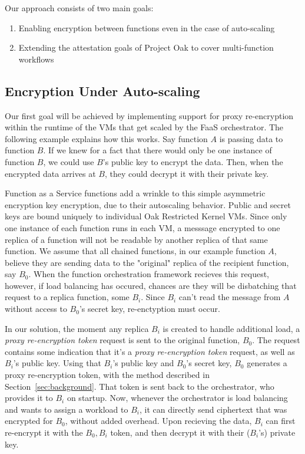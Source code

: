 Our approach consists of two main goals:
\begin{enumerate}
  \item Enabling encryption between functions even in the case of auto-scaling
  \item Extending the attestation goals of Project Oak to cover multi-function workflows
\end{enumerate}

\subsection{Encryption Under Auto-scaling}

Our first goal will be achieved by implementing support for proxy re-encryption within the runtime of the VMs that get scaled by the FaaS orchestrator. The following example explains how this works.
Say function $A$ is passing data to function $B$.
If we knew for a fact that there would only be one instance of function $B$, we could use $B$'s public key to encrypt the data.
Then, when the encrypted data arrives at $B$, they could decrypt it with their private key.

Function as a Service functions add a wrinkle to this simple asymmetric encryption key encryption, due to their autoscaling behavior.
Public and secret keys are bound uniquely to individual Oak Restricted Kernel VMs.
Since only one instance of each function runs in each VM, a messsage encrypted to one replica of a function will not be readable by another replica of that same function.
We assume that all chained functions, in our example function $A$, believe they are sending data to the "original" replica of the recipient function, say $B_0$. 
When the function orchestration framework recieves this request, however, if load balancing has occured, chances are they will be disbatching that request to a replica function, some $B_i$.
Since $B_i$ can't read the message from $A$ without access to $B_0$'s secret key, re-enctyption must occur.

In our solution, the moment any replica $B_i$ is created to handle additional load, a \textit{proxy re-encryption token} request is sent to the original function, $B_0$.
The request contains some indication that it's a \textit{proxy re-encryption token} request, as well as $B_i$'s public key.
Using that $B_i$'s public key and $B_0$'s secret key, $B_0$ generates a proxy re-encryption token, with the method described in Section~\ref{sec:background}. 
That token is sent back to the orchestrator, who provides it to $B_i$ on startup.
Now, whenever the orchestrator is load balancing and wants to assign a workload to $B_i$, it can directly send ciphertext that was encrypted for $B_0$, without added overhead.
Upon recieving the data, $B_i$ can first re-encrypt it with the $B_0,B_i$ token, and then decrypt it with their ($B_i$'s) private key.

